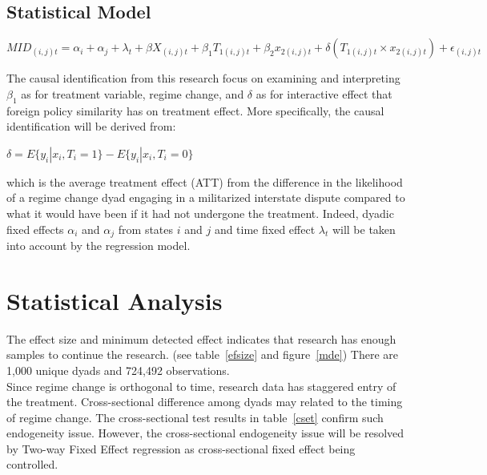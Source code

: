 \documentclass[12pt,a4paper]{article}
\begin{document}
\subsection{Statistical Model}
\begin{center}
        $MID_{(i,j)t} = \alpha_{i} + \alpha_{j}+ \lambda_{t} + \beta X_{(i,j)t} + \beta_1 T_{1(i,j)t} + \beta_2 x_{2(i,j)t} + \delta (T_{1(i,j)t} \times x_{2(i,j)t}) + \epsilon_{(i,j)t}$
\end{center}
The causal identification from this research focus on examining and interpreting $\beta_1$ as for treatment variable, regime change, and $\delta$ as for interactive effect that foreign policy similarity has on treatment effect. More specifically, the causal identification will be derived from: 
\begin{center}
    $\delta=E\{y_i|x_i,T_i=1\}-E\{y_i|x_i,T_i=0\}$
\end{center}
which is the average treatment effect (ATT) from the difference in the likelihood of a regime change dyad engaging in a militarized interstate dispute compared to what it would have been if it had not undergone the treatment. Indeed, dyadic fixed effects $\alpha_{i}$ and $\alpha_{j}$ from states $i$ and $j$ and time fixed effect $\lambda_{t}$ will be taken into account by the regression model.

\section{Statistical Analysis}
The effect size and minimum detected effect indicates that research has enough samples to continue the research. (see table~\ref{efsize} and figure~\ref{mde}) There are 1,000 unique dyads and 724,492 observations.
\\Since regime change is orthogonal to time, research data has staggered entry of the treatment. Cross-sectional difference among dyads may related to the timing of regime change. The cross-sectional test results in table~\ref{cset} confirm such endogeneity issue. However, the cross-sectional endogeneity issue will be resolved by Two-way Fixed Effect regression as cross-sectional fixed effect being controlled. 
\end{document}
